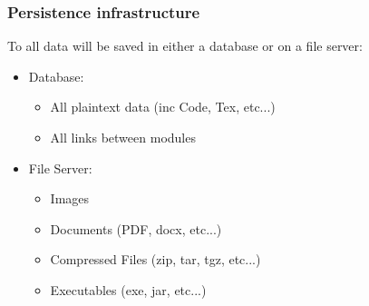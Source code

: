 
	\subsubsection{Persistence infrastructure}
		To all data will be saved in either a database or on a file server:
		\begin{itemize}
			\item  Database:
				\begin{itemize}
					\item All plaintext data (inc Code, Tex, etc...)
					\item All links between modules
				\end{itemize}
			\item  File Server:
				\begin{itemize}
					\item Images
					\item Documents (PDF, docx, etc...)
					\item Compressed Files (zip, tar, tgz, etc...)
					\item Executables (exe, jar, etc...)
				\end{itemize}
		\end{itemize}
		
		
